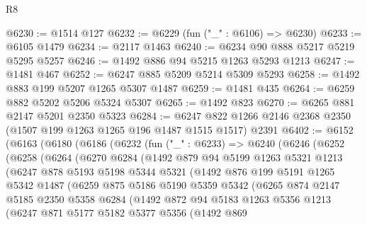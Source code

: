 \begin{lexlean}{R8}
\begin{coremodule}
@6230 := @1514 @127
@6232 := @6229 (fun ("_" : @6106) => @6230)
@6233 := @6105 @1479
@6234 := @2117 @1463
@6240 := @6234 @90 @888 @5217 @5219 @5295 @5257
@6246 := @1492 @886 @94 @5215 @1263 @5293 @1213
@6247 := @1481 @467
@6252 := @6247 @885 @5209 @5214 @5309 @5293
@6258 := @1492 @883 @199 @5207 @1265 @5307 @1487
@6259 := @1481 @435
@6264 := @6259 @882 @5202 @5206 @5324 @5307
@6265 := @1492 @823
@6270 := @6265 @881 @2147 @5201 @2350 @5323
@6284 := @6247 @822 @1266 @2146 @2368 @2350 (@1507 @199 @1263 @1265 @196 @1487 @1515 @1517) @2391
@6402 := @6152
    (@6163
      (@6180
        (@6186
          (@6232
            (fun ("_" : @6233) =>
            @6240
              (@6246
                (@6252
                  (@6258
                    (@6264
                      (@6270
                        @6284
                        (@1492
                          @879
                          @94
                          @5199
                          @1263
                          @5321
                          @1213
                          (@6247
                            @878
                            @5193
                            @5198
                            @5344
                            @5321
                            (@1492
                              @876
                              @199
                              @5191
                              @1265
                              @5342
                              @1487
                              (@6259
                                @875
                                @5186
                                @5190
                                @5359
                                @5342
                                (@6265
                                  @874
                                  @2147
                                  @5185
                                  @2350
                                  @5358
                                  @6284
                                  (@1492
                                    @872
                                    @94
                                    @5183
                                    @1263
                                    @5356
                                    @1213
                                    (@6247
                                      @871
                                      @5177
                                      @5182
                                      @5377
                                      @5356
                                      (@1492
                                        @869

\end{coremodule}
\end{lexlean}
